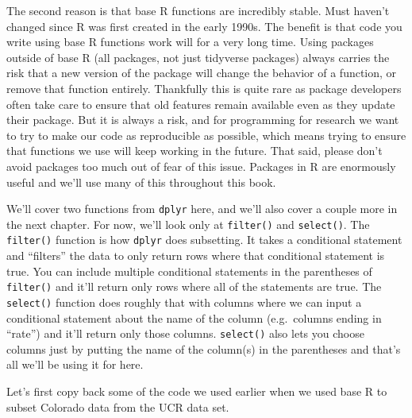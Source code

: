 \documentclass[
]{krantz}
\makeatletter
\newenvironment{Shaded}{\begin{snugshade}}{\end{snugshade}}
\newcommand{\DecValTok}[1]{\textcolor[rgb]{0.06,0.06,0.06}{#1}}
\newcommand{\FunctionTok}[1]{\textcolor[rgb]{0,0,0}{#1}}
\newcommand{\NormalTok}[1]{#1}
\newcommand{\OtherTok}[1]{\textcolor[rgb]{0.37,0.37,0.37}{#1}}
\newcommand{\SpecialCharTok}[1]{\textcolor[rgb]{0,0,0}{#1}}
\newcommand{\StringTok}[1]{\textcolor[rgb]{0.5,0.5,0.5}{#1}}
\newenvironment{kframe}{%
\medskip{}
\setlength{\fboxsep}{.8em}
 \def\at@end@of@kframe{}%
 \ifinner\ifhmode%
  \def\at@end@of@kframe{\end{minipage}}%
  \begin{minipage}{\columnwidth}%
 \fi\fi%
 \def\FrameCommand##1{\hskip\@totalleftmargin \hskip-\fboxsep
 \colorbox{shadecolor}{##1}\hskip-\fboxsep
     \hskip-\linewidth \hskip-\@totalleftmargin \hskip\columnwidth}%
 \MakeFramed {\advance\hsize-\width
   \@totalleftmargin\z@ \linewidth\hsize
   \@setminipage}}%
 {\par\unskip\endMakeFramed%
 \at@end@of@kframe}
\renewenvironment{Shaded}{\begin{kframe}}{\end{kframe}}
\makeatother
\begin{document}
The second reason is that base R functions are incredibly stable. Must haven't changed since R was first created in the early 1990s. The benefit is that code you write using base R functions work will for a very long time. Using packages outside of base R (all packages, not just tidyverse packages) always carries the risk that a new version of the package will change the behavior of a function, or remove that function entirely. Thankfully this is quite rare as package developers often take care to ensure that old features remain available even as they update their package. But it is always a risk, and for programming for research we want to try to make our code as reproducible as possible, which means trying to ensure that functions we use will keep working in the future. That said, please don't avoid packages too much out of fear of this issue. Packages in R are enormously useful and we'll use many of this throughout this book.

We'll cover two functions from \texttt{dplyr} here, and we'll also cover a couple more in the next chapter. For now, we'll look only at \texttt{filter()} and \texttt{select()}. The \texttt{filter()} function is how \texttt{dplyr} does subsetting. It takes a conditional statement and ``filters'' the data to only return rows where that conditional statement is true. You can include multiple conditional statements in the parentheses of \texttt{filter()} and it'll return only rows where all of the statements are true. The \texttt{select()} function does roughly that with columns where we can input a conditional statement about the name of the column (e.g.~columns ending in ``rate'') and it'll return only those columns. \texttt{select()} also lets you choose columns just by putting the name of the column(s) in the parentheses and that's all we'll be using it for here.

Let's first copy back some of the code we used earlier when we used base R to subset Colorado data from the UCR data set.

\begin{Shaded}
\end{Shaded}
\end{document}
